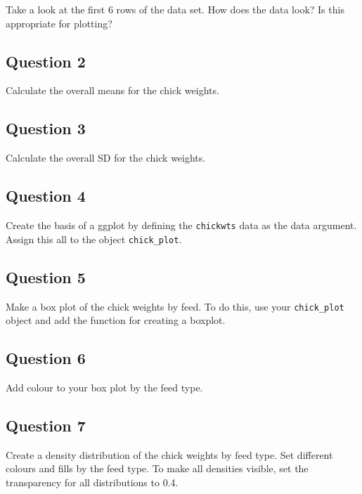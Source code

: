 \documentclass[
]{book}
\begin{document}
Take a look at the first 6 rows of the data set. How does the data look? Is this appropriate for plotting?

\hypertarget{question-2-1}{%
\subsection{Question 2}\label{question-2-1}}

Calculate the overall means for the chick weights.

\hypertarget{question-3-1}{%
\subsection{Question 3}\label{question-3-1}}

Calculate the overall SD for the chick weights.

\hypertarget{question-4-1}{%
\subsection{Question 4}\label{question-4-1}}

Create the basis of a ggplot by defining the \texttt{chickwts} data as the data argument. Assign this all to the object \texttt{chick\_plot}.

\hypertarget{question-5-1}{%
\subsection{Question 5}\label{question-5-1}}

Make a box plot of the chick weights by feed. To do this, use your \texttt{chick\_plot} object and add the function for creating a boxplot.

\hypertarget{question-6-1}{%
\subsection{Question 6}\label{question-6-1}}

Add colour to your box plot by the feed type.

\hypertarget{question-7-1}{%
\subsection{Question 7}\label{question-7-1}}

Create a density distribution of the chick weights by feed type. Set different colours and fills by the feed type. To make all densities visible, set the transparency for all distributions to 0.4.
\end{document}
